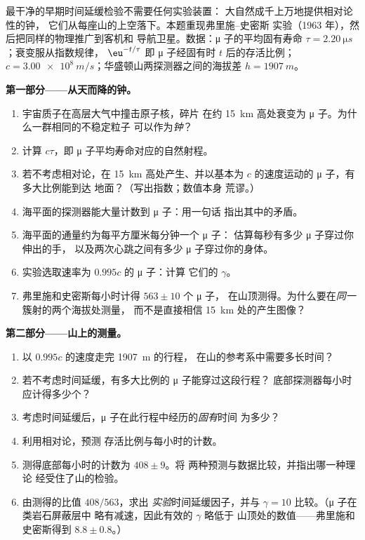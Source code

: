 \begin{problem}\label{pb:b3:relativistic-kinematics:1}
最干净的早期时间延缓检验不需要任何实验装置：
大自然成千上万地提供相对论性的钟，
它们从每座山的上空落下。本题重现弗里施–史密斯
实验（1963 年），然后把同样的物理推广到客机和
导航卫星。数据：μ 子的平均固有寿命 $\tau =
\qty{2.20}{\micro s}$；衰变服从指数规律，
$\eu^{-t/\tau}$ 即 μ 子经固有时 $t$ 后的存活比例；$c =
\qty{3.00e8}{m/s}$；华盛顿山两探测器之间的海拔差 $h =
\qty{1907}{m}$。

\medskip\noindent\textbf{第一部分——从天而降的钟。}
\begin{enumerate}
  \item 宇宙质子在高层大气中撞击原子核，碎片
        在约 \qty{15}{km} 高处衰变为 μ 子。为什么一群相同的不稳定粒子
        可以作为\emph{钟}？
  \item 计算 $c\tau$，即 μ 子平均寿命对应的自然射程。
  \item 若不考虑相对论，在
        \qty{15}{km} 高处产生、并以基本为 $c$ 的速度运动的 μ 子，有多大比例能到达
        地面？（写出指数；数值本身
        荒谬。）
  \item 海平面的探测器能大量计数到 μ 子：用一句话
        指出其中的矛盾。
  \item 海平面的通量约为每平方厘米每分钟一个 μ 子：
        估算每秒有多少 μ 子穿过你伸出的手，
        以及两次心跳之间有多少 μ 子穿过你的身体。
  \item 实验选取速率为 $0.995c$ 的 μ 子：计算
        它们的 $\gamma$。
  \item 弗里施和史密斯每小时计得 $563 \pm 10$ 个 μ 子，
        在山顶测得。为什么要在\emph{同一}簇射的两个海拔处测量，
        而不是直接相信 \qty{15}{km} 处的产生图像？
\end{enumerate}

\medskip\noindent\textbf{第二部分——山上的测量。}
\begin{enumerate}[resume]
  \item 以 $0.995c$ 的速度走完 \qty{1907}{m} 的行程，
        在山的参考系中需要多长时间？
  \item 若不考虑时间延缓，有多大比例的 μ 子能穿过这段行程？
        底部探测器每小时应计得多少个？
  \item 考虑时间延缓后，μ 子在此行程中经历的\emph{固有}时间
        为多少？
  \item 利用相对论，预测
        存活比例与每小时的计数。
  \item 测得底部每小时的计数为 $408 \pm 9$。将
        两种预测与数据比较，并指出哪一种理论
        经受住了山的检验。
  \item 由测得的比值 $408/563$，求出
        \emph{实验}时间延缓因子，并与
        $\gamma = 10$ 比较。（μ 子在类岩石屏蔽层中
        略有减速，因此有效的 $\gamma$ 略低于
        山顶处的数值——弗里施和史密斯得到 $8.8 \pm
        0.8$。）
\end{enumerate}


\end{problem}

